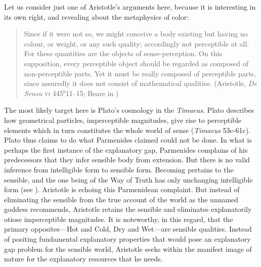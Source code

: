 Let us consider just one of Aristotle's arguments here, because it is interesting in its own right, and revealing about the metaphysics of color:
\begin{quote}
	Since if it were not so, we might conceive a body existing but having no colour, or weight, or any such quality; accordingly not perceptible at all. For these quantities are the objects of sense-perception. On this supposition, every perceptible object should be regarded as composed of non-perceptible parts. Yet it must be really composed of perceptible parts, since assuredly it does not consist of mathematical qualities. (Aristotle, \emph{De Sensu} \textsc{vi} 445\( ^{b} \)11--15; Beare in \citealt[18]{Barnes:1984uq})
\end{quote}
The most likely target here is Plato's cosmology in the \emph{Timaeus}. Plato describes how geometrical particles, imperceptible magnitudes, give rise to perceptible elements which in turn constitutes the whole world of sense (\emph{Timaeus} 53c-61c). Plato thus claims to do what Parmenides claimed could not be done. In what is perhaps the first instance of the explanatory gap, Parmenides complains of his predecessors that they infer sensible body from extension. But there is no valid inference from intelligible form to sensible form. Becoming pertains to the sensible, and the one being of the Way of Truth has only unchanging intelligible form (see \citealt[49]{Guthrie:1965ys}). Aristotle is echoing this Parmenidean complaint. But instead of eliminating the sensible from the true account of the world as the unnamed goddess recommends, Aristotle retains the sensible and eliminates explanatorily otiose imperceptible magnitudes. It is noteworthy, in this regard, that the primary opposites---Hot and Cold, Dry and Wet---are sensible qualities. Instead of positing fundamental explanatory properties that would pose an explanatory gap problem for the sensible world, Aristotle seeks within the manifest image of nature for the explanatory resources that he needs. 

